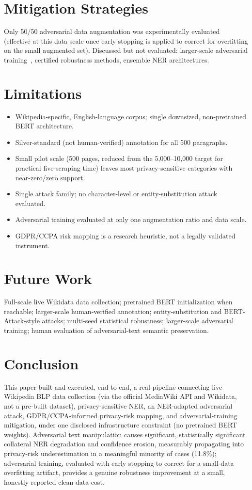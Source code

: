 \documentclass[conference]{IEEEtran}
\begin{document}
\section{Mitigation Strategies}\label{sec:mitigation}
Only 50/50 adversarial data augmentation was experimentally evaluated (effective at this data scale once early stopping is applied to correct for overfitting on the small augmented set). Discussed but not evaluated: larger-scale adversarial training~\cite{simoncini2021seqattack}, certified robustness methods, ensemble NER architectures.

\section{Limitations}
\begin{itemize}
\item Wikipedia-specific, English-language corpus; single downsized, non-pretrained BERT architecture.
\item Silver-standard (not human-verified) annotation for all 500 paragraphs.
\item Small pilot scale (500 pages, reduced from the 5{,}000--10{,}000 target for practical live-scraping time) leaves most privacy-sensitive categories with near-zero/zero support.
\item Single attack family; no character-level or entity-substitution attack evaluated.
\item Adversarial training evaluated at only one augmentation ratio and data scale.
\item GDPR/CCPA risk mapping is a research heuristic, not a legally validated instrument.
\end{itemize}

\section{Future Work}
Full-scale live Wikidata data collection; pretrained BERT initialization when reachable; larger-scale human-verified annotation; entity-substitution and BERT-Attack-style attacks; multi-seed statistical robustness; larger-scale adversarial training; human evaluation of adversarial-text semantic preservation.

\section{Conclusion}
This paper built and executed, end-to-end, a real pipeline connecting live Wikipedia BLP data collection (via the official MediaWiki API and Wikidata, not a pre-built dataset), privacy-sensitive NER, an NER-adapted adversarial attack, GDPR/CCPA-informed privacy-risk mapping, and adversarial-training mitigation, under one disclosed infrastructure constraint (no pretrained BERT weights). Adversarial text manipulation causes significant, statistically significant collateral NER degradation and confidence erosion, measurably propagating into privacy-risk underestimation in a meaningful minority of cases (11.8\%); adversarial training, evaluated with early stopping to correct for a small-data overfitting artifact, provides a genuine robustness improvement at a small, honestly-reported clean-data cost.



\end{document}
